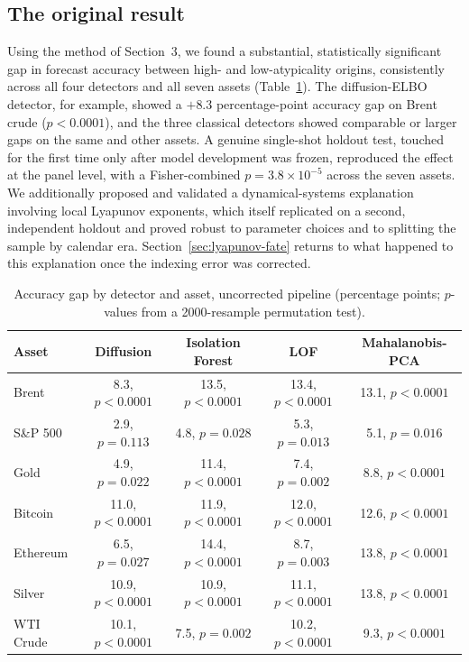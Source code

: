 \documentclass[preprint,12pt]{elsarticle}
\begin{document}
\subsection{The original result}
Using the method of Section~3, we found a substantial, statistically significant gap in
forecast accuracy between high- and low-atypicality origins, consistently across all four
detectors and all seven assets (Table~\ref{tab:prefix}). The diffusion-ELBO detector, for
example, showed a $+8.3$ percentage-point accuracy gap on Brent crude ($p<0.0001$), and the
three classical detectors showed comparable or larger gaps on the same and other assets. A
genuine single-shot holdout test, touched for the first time only after model development was
frozen, reproduced the effect at the panel level, with a Fisher-combined $p = 3.8\times
10^{-5}$ across the seven assets. We additionally proposed and validated a dynamical-systems
explanation involving local Lyapunov exponents, which itself replicated on a second,
independent holdout and proved robust to parameter choices and to splitting the sample by
calendar era. Section~\ref{sec:lyapunov-fate} returns to what happened to this explanation
once the indexing error was corrected.

\begin{table}[h]
\centering
\caption{Accuracy gap by detector and asset, uncorrected pipeline (percentage points; $p$-values from a 2000-resample permutation test).}
\label{tab:prefix}
\footnotesize
\setlength{\tabcolsep}{4pt}
\begin{tabular}{@{}lcccc@{}}
\toprule
Asset & Diffusion & Isolation Forest & LOF & Mahalanobis-PCA \\
\midrule
Brent & 8.3, $p<0.0001$ & 13.5, $p<0.0001$ & 13.4, $p<0.0001$ & 13.1, $p<0.0001$ \\
S\&P 500 & 2.9, $p=0.113$ & 4.8, $p=0.028$ & 5.3, $p=0.013$ & 5.1, $p=0.016$ \\
Gold & 4.9, $p=0.022$ & 11.4, $p<0.0001$ & 7.4, $p=0.002$ & 8.8, $p<0.0001$ \\
Bitcoin & 11.0, $p<0.0001$ & 11.9, $p<0.0001$ & 12.0, $p<0.0001$ & 12.6, $p<0.0001$ \\
Ethereum & 6.5, $p=0.027$ & 14.4, $p<0.0001$ & 8.7, $p=0.003$ & 13.8, $p<0.0001$ \\
Silver & 10.9, $p<0.0001$ & 10.9, $p<0.0001$ & 11.1, $p<0.0001$ & 13.8, $p<0.0001$ \\
WTI Crude & 10.1, $p<0.0001$ & 7.5, $p=0.002$ & 10.2, $p<0.0001$ & 9.3, $p<0.0001$ \\
\bottomrule
\end{tabular}
\end{table}
\end{document}
